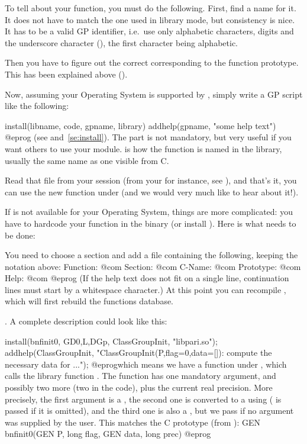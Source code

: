 To tell  about your function, you must do the following. First, find a
name for it. It does not have to match the one used in library mode, but
consistency is nice. It has to be a valid GP identifier, i.e.~use only
alphabetic characters, digits and the underscore character (\kbd{\_}), the
first character being alphabetic.

Then you have to figure out the correct  corresponding to
the function prototype. This has been explained above
().

Now, assuming your Operating System is supported by , simply
write a GP script like the following:

\bprog
install(libname, code, gpname, library)
addhelp(gpname, "some help text")
@eprog
\noindent(see  and~\ref{se:install}). The 
part is not mandatory, but very useful if you want others to use your
module.  is how the function is named in the library,
usually the same name as one visible from C.

Read that file from your  session (from your  for
instance, see ), and that's it, you can use the new
function  under  (and we would very much like to hear about
it!).


If  is not available for your Operating System, things are more
complicated: you have to hardcode your function in the  binary (or
install ). Here is what needs to be done:

You need to choose a section and add a file
containing the following, keeping the notation above:
\bprog
Function:  @com
Section:   @com
C-Name:    @com
Prototype: @com
Help:      @com
@eprog\noindent
(If the help text does not fit on a single line, continuation lines must
start by a whitespace character.) At this point you can recompile ,
which will first rebuild the functions database.

.
%
A complete description could look like this:

\bprog
{
  install(bnfinit0, GD0,L,DGp, ClassGroupInit, "libpari.so");
  addhelp(ClassGroupInit, "ClassGroupInit(P,{flag=0},{data=[]}):
    compute the necessary data for ...");
}
@eprog\noindent which means we have a function  under
, which calls the library function  . The function has
one mandatory argument, and possibly two more (two  in the code),
plus the current real precision. More precisely, the first argument is a
, the second one is converted to a  using 
( is passed if it is omitted), and the third one is also a ,
but we pass  if no argument was supplied by the user. This matches
the C prototype (from ):
%
\bprog
  GEN bnfinit0(GEN P, long flag, GEN data, long prec)
@eprog


